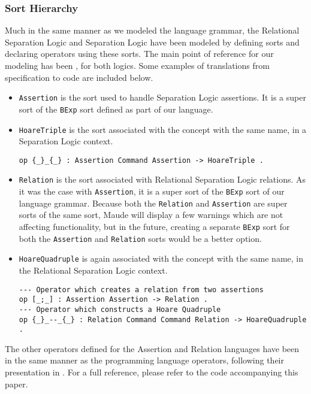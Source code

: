 \documentclass[12pt,a4paper]{article}
\begin{document}
\subsubsection{Sort Hierarchy}
Much in the same manner as we modeled the language grammar, the Relational Separation Logic \cite{relational} and Separation Logic \cite{SeparationLogic} \cite{primer} have been modeled by defining sorts and declaring operators using these sorts. The main point of reference for our modeling has been \cite{relational}, for both logics. Some examples of translations from specification to code are included below.
\begin{itemize}
	\item \texttt{Assertion} is the sort used to handle Separation Logic assertions. It is a super sort of the \texttt{BExp} sort defined as part of our language.
	\item \texttt{HoareTriple} is the sort associated with the concept with the same name, in a Separation Logic context.
	\begin{lstlisting}[caption=Hoare Triple constructor operator]
op {_}_{_} : Assertion Command Assertion -> HoareTriple .\end{lstlisting}
	\item \texttt{Relation} is the sort associated with Relational Separation Logic relations. As it was the case with \texttt{Assertion}, it is a super sort of the \texttt{BExp} sort of our language grammar. Because both the \texttt{Relation} and \texttt{Assertion} are super sorts of the same sort, Maude will display a few warnings which are not affecting functionality, but in the future, creating a separate \texttt{BExp} sort for both the \texttt{Assertion} and \texttt{Relation} sorts would be a better option.
	\item \texttt{HoareQuadruple} is again associated with the concept with the same name, in the Relational Separation Logic context.
	\begin{lstlisting}[caption=Examples of Relational Separation Logic specific constructs]
--- Operator which creates a relation from two assertions
op [_;_] : Assertion Assertion -> Relation .
--- Operator which constructs a Hoare Quadruple 
op {_}_--_{_} : Relation Command Command Relation -> HoareQuadruple .\end{lstlisting}
\end{itemize}
The other operators defined for the Assertion and Relation languages have been in the same manner as the programming language operators, following their presentation in \cite{relational}. For a full reference, please refer to the code accompanying this paper.
\end{document}
